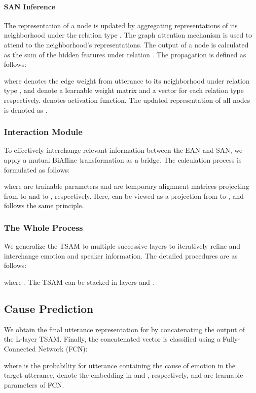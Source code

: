 \documentclass[11pt]{article}
\begin{document}
\paragraph{SAN Inference} The representation of a node  is updated by aggregating representations of its neighborhood  under the relation type . The graph attention mechanism \citep{velivckovic2018graph} is used to attend to the neighborhood's representations. The output of a node  is calculated as the sum of the hidden features  under relation . The propagation is defined as follows:

where  denotes the edge weight from utterance  to its neighborhood  under relation type ,  and  denote a learnable weight matrix and a vector for each relation type  respectively.  denotes  activation function. The updated representation of all nodes is denoted as .



\subsubsection{Interaction Module}
To effectively interchange relevant information between the EAN and SAN, we apply a mutual BiAffine transformation as a bridge. The calculation process is formulated as follows:

where  are trainable parameters and  are temporary alignment matrices projecting from  to  and  to , respectively. Here,  can be viewed as a projection from  to  , and  follows the same principle.

\subsubsection{The Whole Process}
We generalize the TSAM to multiple successive layers to iteratively refine and interchange emotion and speaker information. The detailed procedures are as follows:

where . The TSAM can be stacked in  layers and . 



\subsection{Cause Prediction}
We obtain the final utterance representation for  by concatenating the output  of the L-layer TSAM. Finally, the concatenated vector is classified using a Fully-Connected Network (FCN):

where  is the probability for utterance  containing the cause of emotion in the target utterance,  denote the  embedding in  and , respectively,  and  are learnable parameters of FCN. 
\end{document}

